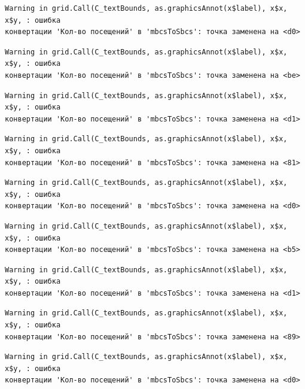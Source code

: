 \documentclass[
  letterpaper,
  DIV=11,
  numbers=noendperiod]{scrreprt}
\begin{document}
\begin{verbatim}
Warning in grid.Call(C_textBounds, as.graphicsAnnot(x$label), x$x, x$y, : ошибка
конвертации 'Кол-во посещений' в 'mbcsToSbcs': точка заменена на <d0>
\end{verbatim}

\begin{verbatim}
Warning in grid.Call(C_textBounds, as.graphicsAnnot(x$label), x$x, x$y, : ошибка
конвертации 'Кол-во посещений' в 'mbcsToSbcs': точка заменена на <be>
\end{verbatim}

\begin{verbatim}
Warning in grid.Call(C_textBounds, as.graphicsAnnot(x$label), x$x, x$y, : ошибка
конвертации 'Кол-во посещений' в 'mbcsToSbcs': точка заменена на <d1>
\end{verbatim}

\begin{verbatim}
Warning in grid.Call(C_textBounds, as.graphicsAnnot(x$label), x$x, x$y, : ошибка
конвертации 'Кол-во посещений' в 'mbcsToSbcs': точка заменена на <81>
\end{verbatim}

\begin{verbatim}
Warning in grid.Call(C_textBounds, as.graphicsAnnot(x$label), x$x, x$y, : ошибка
конвертации 'Кол-во посещений' в 'mbcsToSbcs': точка заменена на <d0>
\end{verbatim}

\begin{verbatim}
Warning in grid.Call(C_textBounds, as.graphicsAnnot(x$label), x$x, x$y, : ошибка
конвертации 'Кол-во посещений' в 'mbcsToSbcs': точка заменена на <b5>
\end{verbatim}

\begin{verbatim}
Warning in grid.Call(C_textBounds, as.graphicsAnnot(x$label), x$x, x$y, : ошибка
конвертации 'Кол-во посещений' в 'mbcsToSbcs': точка заменена на <d1>
\end{verbatim}

\begin{verbatim}
Warning in grid.Call(C_textBounds, as.graphicsAnnot(x$label), x$x, x$y, : ошибка
конвертации 'Кол-во посещений' в 'mbcsToSbcs': точка заменена на <89>
\end{verbatim}

\begin{verbatim}
Warning in grid.Call(C_textBounds, as.graphicsAnnot(x$label), x$x, x$y, : ошибка
конвертации 'Кол-во посещений' в 'mbcsToSbcs': точка заменена на <d0>
\end{verbatim}
\end{document}
